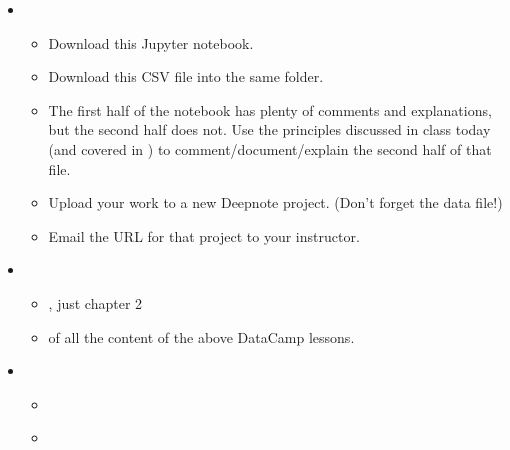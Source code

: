 \documentclass[letterpaper,10pt,english]{sphinxmanual}
\begin{document}
\label{\detokenize{course-schedule:id4}}\begin{itemize}
\item {} 
\begin{itemize}
\item {} 
Download this Jupyter notebook.

\item {} 
Download this CSV file into the same folder.

\item {} 
The first half of the notebook has plenty of comments and explanations, but the second half does not.  Use the principles discussed in class today (and covered in {\hyperref[\detokenize{chapter-5-before-and-after::doc}]{}}) to comment/document/explain the second half of that file.

\item {} 
Upload your work to a new Deepnote project.  (Don’t forget the data file!)

\item {} 
Email the URL for that project to your instructor.

\end{itemize}

\item {} 
\begin{itemize}
\item {} 
, just chapter 2

\item {} 
 of all the content of the above DataCamp lessons.

\end{itemize}

\item {} 
\begin{itemize}
\item {} 
{\hyperref[\detokenize{chapter-7-abstraction::doc}]{}}

\item {} 
{\hyperref[\detokenize{chapter-8-version-control::doc}]{}}

\end{itemize}

\end{itemize}
\end{document}
